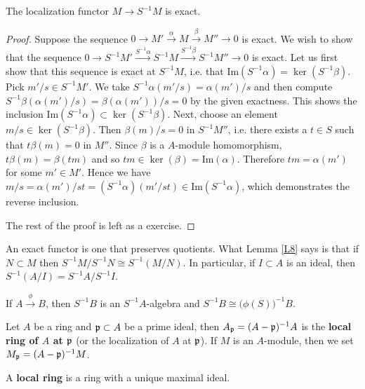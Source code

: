 \documentclass{../mathnotes}
\begin{document}
\begin{lem}
\label{L8}
    The localization functor $M\to S^{-1}M$ is exact.
\end{lem}
\begin{proof}
    Suppose the sequence $0\to M'\overset{\alpha}{\to} M\overset{\beta}{\to} M''\to 0$ is exact. We wish to show that the sequence $0\to S^{-1}M'\overset{S^{-1}\alpha}{\to} S^{-1}M\overset{S^{-1}\beta}{\to} S^{-1}M''\to 0$ is exact. Let us first show that this sequence is exact at $S^{-1}M$, i.e. that $\text{Im} (S^{-1}\alpha)=\ker(S^{-1}\beta)$. Pick $m'/s\in S^{-1}M'$. We take $S^{-1}\alpha(m'/s)=\alpha(m')/s$ and then compute $S^{-1}\beta(\alpha(m')/s)=\beta(\alpha(m'))/s=0$ by the given exactness. This shows the inclusion $\text{Im} (S^{-1}\alpha)\subset\ker(S^{-1}\beta)$. Next, choose an element $m/s\in \ker(S^{-1}\beta).$ Then $\beta(m)/s=0$ in $S^{-1}M''$, i.e. there exists a $t\in S$ such that $t\beta(m)=0$ in $M''$. Since $\beta$ is a $A$-module homomorphism, $t\beta(m)=\beta(tm)$ and so $tm\in\ker(\beta)=\text{Im}(\alpha)$. Therefore $tm=\alpha(m')$ for some $m'\in M'$. Hence we have $m/s=\alpha(m')/st=(S^{-1}\alpha)(m'/st)\in\text{Im}(S^{-1}\alpha)$, which demonstrates the reverse inclusion.
    
    The rest of the proof is left as a exercise.
\end{proof}

\begin{rem}
An exact functor is one that preserves quotients. What Lemma \ref{L8} says is that if $N\subset M$ then $S^{-1}M/S^{-1}N \cong S^{-1}(M/N)$. In particular, if $I\subset A$ is an ideal, then $S^{-1}(A/I) = S^{-1}A/S^{-1}I$.
\end{rem}

\begin{rem}
If $A \overset{\phi}{\to} B$, then $S^{-1}B$ is an $S^{-1}A$-algebra and $S^{-1}B \cong \big(\phi(S)\big)^{-1} B$.
\end{rem}

\begin{defn}
Let $A$ be a ring and $\mathfrak p\subset A$ be a prime ideal, then $A_{\mathfrak p} = (A-\mathfrak p)^{-1}A$ is the \textbf{local ring of $A$ at $\mathfrak p$} (or the localization of $A$ at $\mathfrak p$). If $M$ is an $A$-module, then we set $M_{\mathfrak p} = (A-\mathfrak{p})^{-1}M$.
\end{defn}

\begin{defn}
A \textbf{local ring} is a ring with a unique maximal ideal.
\end{defn}
\end{document}
